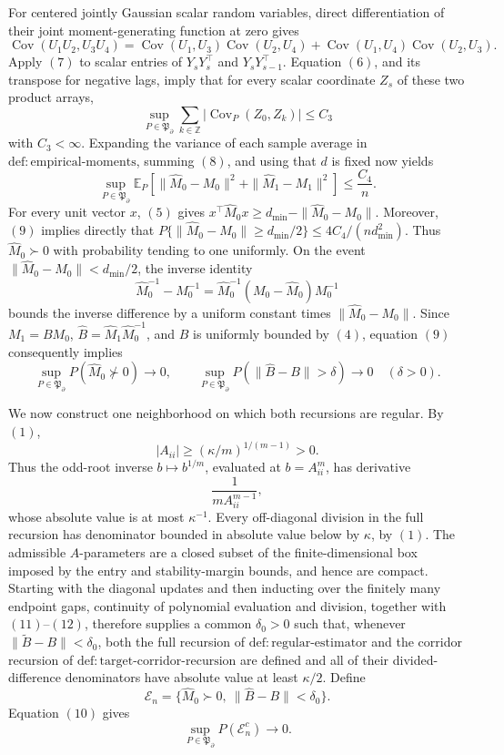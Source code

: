 For centered jointly Gaussian scalar random variables, direct
differentiation of their joint moment-generating function at zero gives
\[
 \operatorname{Cov}(U_1U_2,U_3U_4)
 =\operatorname{Cov}(U_1,U_3)\operatorname{Cov}(U_2,U_4)
  +\operatorname{Cov}(U_1,U_4)\operatorname{Cov}(U_2,U_3).
 \tag{7}
\]
Apply \((7)\) to scalar entries of \(Y_sY_s^\top\) and
\(Y_sY_{s-1}^\top\).  Equation \((6)\), and its transpose for negative
lags, imply that for every scalar coordinate \(Z_s\) of these two product
arrays,
\[
 \sup_{P\in\mathfrak P_{\partial}}
 \sum_{k\in\mathbb Z}
 \bigl|\operatorname{Cov}_P(Z_0,Z_k)\bigr|\leq C_3
 \tag{8}
\]
with \(C_3<\infty\).  Expanding the variance of each sample average in
\(\mathrm{def{:}empirical\mbox{-}moments}\), summing \((8)\), and using
that \(d\) is fixed now yields
\[
 \sup_{P\in\mathfrak P_{\partial}}
 \mathbb E_P\!\left[
  \|\widehat M_0-M_0\|^2+
  \|\widehat M_1-M_1\|^2
 \right]\leq\frac{C_4}{n}.
 \tag{9}
\]
For every unit vector \(x\), \((5)\) gives
\(x^\top\widehat M_0x\geq d_{\min}-\|\widehat M_0-M_0\|\).
Moreover, \((9)\) implies directly that
\(P\{\|\widehat M_0-M_0\|\geq d_{\min}/2\}\leq
4C_4/(nd_{\min}^2)\).  Thus \(\widehat M_0\succ0\) with probability
tending to one uniformly.  On the event
\(\|\widehat M_0-M_0\|<d_{\min}/2\), the inverse
identity
\[
 \widehat M_0^{-1}-M_0^{-1}
 =\widehat M_0^{-1}(M_0-\widehat M_0)M_0^{-1}
\]
bounds the inverse difference by a uniform constant times
\(\|\widehat M_0-M_0\|\).  Since
\(M_1=BM_0\), \(\widehat B=\widehat M_1\widehat M_0^{-1}\), and \(B\) is
uniformly bounded by \((4)\), equation \((9)\) consequently implies
\[
 \sup_{P\in\mathfrak P_{\partial}}P(\widehat M_0\not\succ0)
 \longrightarrow0,
 \qquad
 \sup_{P\in\mathfrak P_{\partial}}
 P\!\left(\|\widehat B-B\|>\delta\right)
 \longrightarrow0
 \quad(\delta>0).
 \tag{10}
\]

We now construct one neighborhood on which both recursions are regular.
By \((1)\),
\[
 |A_{ii}|\geq (\kappa/m)^{1/(m-1)}>0.
 \tag{11}
\]
Thus the odd-root inverse \(b\mapsto b^{1/m}\), evaluated at
\(b=A_{ii}^m\), has derivative
\[
 \frac{1}{mA_{ii}^{m-1}},
 \tag{12}
\]
whose absolute value is at most \(\kappa^{-1}\).  Every off-diagonal
division in the full recursion has denominator bounded in absolute value
below by \(\kappa\), by \((1)\).  The admissible \(A\)-parameters are a
closed subset of the finite-dimensional box imposed by the entry and
stability-margin bounds, and hence are compact.  Starting with the
diagonal updates and then inducting over the finitely many endpoint gaps,
continuity of polynomial evaluation and division, together with
\((11)\)--\((12)\), therefore supplies a common \(\delta_0>0\) such that,
whenever \(\|\widetilde B-B\|<\delta_0\), both the full recursion of
\(\mathrm{def{:}regular\mbox{-}estimator}\) and the corridor recursion of
\(\mathrm{def{:}target\mbox{-}corridor\mbox{-}recursion}\) are defined and
all of their divided-difference denominators have absolute value at least
\(\kappa/2\).  Define
\[
 \mathcal E_n
 =\{\widehat M_0\succ0,\ \|\widehat B-B\|<\delta_0\}.
\]
Equation \((10)\) gives
\[
 \sup_{P\in\mathfrak P_{\partial}}P(\mathcal E_n^c)
 \longrightarrow0.
 \tag{13}
\]

